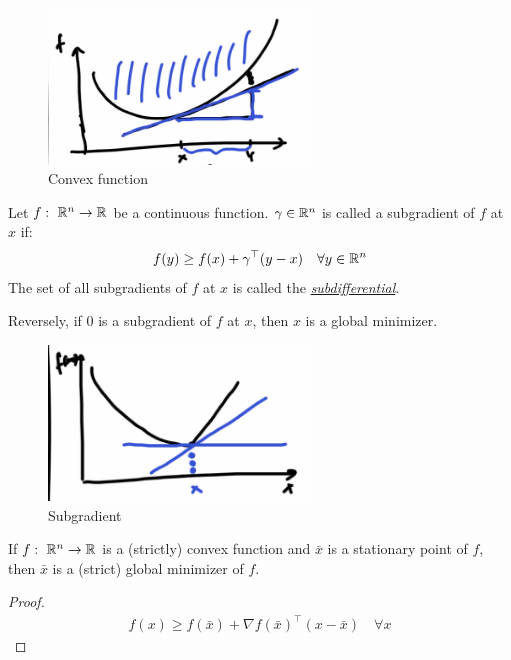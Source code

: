 \documentclass[11pt]{article}
\numberwithin{equation}{section}
\begin{document}
\begin{figure}[H]
    \centering
    \includegraphics[width=7cm]{images/9-ex-5.png}
    \caption{Convex function}
\end{figure}

\begin{definition}
    Let $f: \ \mathbb R^n \rightarrow \mathbb R$ be a continuous function. $\gamma \in \mathbb R^n$ is called a subgradient of $f$ at $x$ if:\begin{align*}
        f(y) \geq f(x)+\gamma^{\top}(y-x) \quad \forall y \in \mathbb R^n
    \end{align*}
    The set of all subgradients of $f$ at $x$ is called the \underline{\textit{subdifferential}}.
\end{definition}

Reversely, if $0$ is a subgradient of $f$ at $x$, then $x$ is a global minimizer.

\begin{figure}[H]
    \centering
    \includegraphics[width=7cm]{images/9-df-1.png}
    \caption{Subgradient}
\end{figure}

\begin{corollary}
    If $f: \ \mathbb R^n \rightarrow \mathbb R$ is a (strictly) convex function and $\bar{x}$ is a stationary point of $f$, then $\bar{x}$ is a (strict) global minimizer of $f$.
    \begin{proof}
        \begin{align*}
            f(x) \geq f(\bar{x}) + \nabla f(\bar{x})^\top (x-\bar{x}) \quad \forall x
        \end{align*}
    \end{proof}
\end{corollary}
\end{document}
